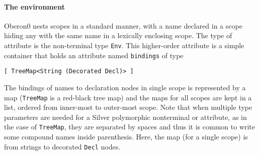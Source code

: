\begin{comment}
The result type of looking up a name in the environment --
 -- is a \textit{reference attribute} to the
node in the tree that declared that name.
%
Binding names to declaration sites is a relatively standard use for
reference attributes.
%
%
%
Typically, reference attributes come along with some features for manipulating
them, such as \textit{remote attributes}.
%
%
Reference attributes remain extremely useful, however, as this simplifies
many kinds of environment lookups.
%
For example, as we will see later, type checking and renaming transformations
can all proceed with no modifications to the environment: they simply consult
different attributes on the declaration node.
\end{comment}


\paragraph{The environment}
Oberon0 nests scopes in a standard manner, with a name declared in a
scope hiding any with the same name in a lexically enclosing scope.
%
The type of attribute  is the non-terminal type
\texttt{Env}.  This higher-order attribute is a simple container that holds
an attribute named \texttt{bindings} of type 
\begin{verbatim}
[ TreeMap<String (Decorated Decl)> ]
\end{verbatim}
%
The bindings of names to declaration nodes in single scope is
represented by a map (\texttt{TreeMap} is a red-black tree map) and
the maps for all scopes are kept in a list, ordered from inner-most to
outer-most scope.
%
Note that when multiple type parameters are needed for a Silver
polymorphic nonterminal or attribute, as in the case of
\texttt{TreeMap}, they are separated by spaces and thus it is common
to write some compound names inside parenthesis.  Here, the map (for a
single scope) is from strings to decorated \texttt{Decl} nodes.



